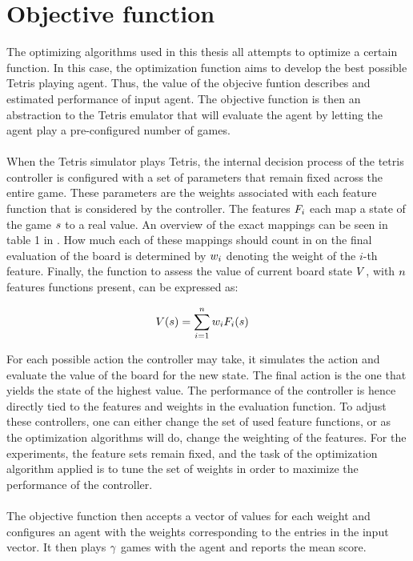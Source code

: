 \section{Objective function}

The optimizing algorithms used in this thesis all attempts to 
optimize a certain function. In this case, the optimization 
function aims to develop the best possible Tetris playing agent.
Thus, the value of the objecive funtion describes and estimated 
performance of input agent. The objective function is then 
an abstraction to the Tetris emulator that will evaluate 
the agent by letting the agent play a pre-configured number 
of games.\\
\\
When the Tetris simulator plays Tetris, the internal decision process
of the tetris controller is configured with a set of parameters that remain
fixed across the entire game. These parameters are the weights associated 
with each feature function that is considered by the controller. The features $F _{i}$
each map a state of the game $s$ to a real value. An overview of the exact mappings
can be seen in table 1 in \citep{scherrer2009:b}. How much each of these mappings
should count in on the final evaluation of the board is determined by $w _{i}$
denoting the weight of the $i$-th feature. Finally, the function to assess the value 
of current board state $V$, with $n$ features functions present, can be expressed as:

\begin{align*}
V (s ) &= \sum_{i=1}^{n} w _{i}F _{i}(s )
\end{align*}

For each possible action the controller may take, it simulates 
the action and evaluate the value of the board for the new state. 
The final action is the one that yields the state of the highest value.
The performance of the controller is hence directly tied to the 
features and weights in the evaluation function. To adjust these controllers,
one can either change the set of used feature functions, or as the 
optimization algorithms will do, change the weighting of the features.
For the experiments, the feature sets remain fixed, and the task of the
optimization algorithm applied is to tune the set of weights in order 
to maximize the performance of the controller.\\
\\
The objective function then accepts a vector of values for each weight
and configures an agent with the weights corresponding to the entries in
the input vector. It then plays $\gamma$ games with the
agent and reports the mean score.




